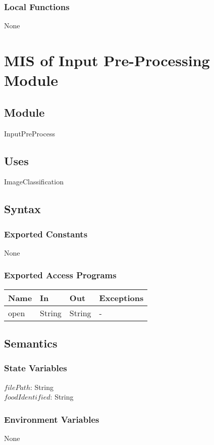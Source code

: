 \documentclass[12pt, titlepage]{article}
\begin{document}
\subsubsection{Local Functions}
None

\newpage

\section{MIS of Input Pre-Processing Module} \label{InputPreProcess}
\subsection{Module}
InputPreProcess
\subsection{Uses}
ImageClassification
\subsection{Syntax}
\subsubsection{Exported Constants}
None
\subsubsection{Exported Access Programs}
\begin{center}
	\begin{tabular}{p{2cm} p{4cm} p{4cm} p{2cm}}
		\hline
		\textbf{Name} & \textbf{In} & \textbf{Out} & \textbf{Exceptions} \\
		\hline
		open & String & String & - \\
		\hline
	\end{tabular}
\end{center}
\subsection{Semantics}
\subsubsection{State Variables}
$filePath$: String\\
$foodIdentified$: String
\subsubsection{Environment Variables}
None
\end{document}
